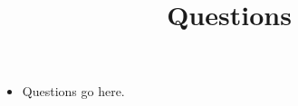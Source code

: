 \documentclass{report}
\begin{document}
 
\title{Questions} 
\maketitle 

\begin{itemize}
	\item
	Questions go here.

\end{itemize}
\end{document}
